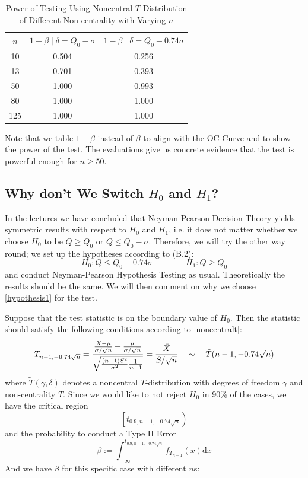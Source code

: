 \documentclass[12pt]{article}
\def\d{\mathrm{d}}
\begin{document}
\begin{table}[htbp]
    \centering
    \begin{tabular}{ccc}
        \toprule
        $n$ & $1-\beta\mid\delta = Q_0 - \sigma$ & $1-\beta\mid\delta = Q_0 - 0.74\sigma$ \\
        \midrule
        10 & 0.504 & 0.256 \\
        13 & 0.701 & 0.393 \\
        50 & 1.000 & 0.993 \\
        80 & 1.000 & 1.000 \\
        125 & 1.000 & 1.000 \\
        \bottomrule
    \end{tabular}
    \caption{Power of Testing Using Noncentral $T$-Distribution of Different Non-centrality with Varying $n$}
\end{table}

\noindent Note that we table $1-\beta$ instead of $\beta$ to align with the OC Curve and to show the power of the test. The evaluations give us concrete evidence that the test is powerful enough for $n\geq 50$.

\subsection{Why don't We Switch $H_0$ and $H_1$?}

In the lectures \cite{Ho2023} we have concluded that Neyman-Pearson Decision Theory yields symmetric results with respect to $H_0$ and $H_1$, i.e. it does not matter whether we choose $H_0$ to be $Q \geq Q_0$ or $Q \leq Q_0 - \sigma$. Therefore, we will try the other way round; we set up the hypotheses according to (B.2):
\begin{equation}\label{hypothesis2}
    H_0 : Q\leq Q_0 - 0.74\sigma \quad\quad\quad\quad H_1 : Q\geq Q_0
\end{equation}
and conduct Neyman-Pearson Hypothesis Testing as usual. Theoretically the results should be the same. We will then comment on why we choose \eqref{hypothesis1} for the test. 

Suppose that the test statistic is on the boundary value of $H_0$. Then the statistic should satisfy the following conditions according to \eqref{noncentralt}:
$$
T_{n-1,-0.74\sqrt{n}}=\frac{\frac{\Bar{X}-\mu}{\sigma/\sqrt{n}}+\frac{\mu}{\sigma/\sqrt{n}}}{\sqrt{\frac{(n-1)S^2}{\sigma^2}\frac{1}{n-1}}}=\frac{\Bar{X}}{S/\sqrt{n}}\quad\sim\quad \tilde{T}(n-1,-0.74\sqrt{n})
$$
where $\tilde{T}(\gamma, \delta)$ denotes a noncentral $T$-distribution with degrees of freedom $\gamma$ and non-centrality $T$. Since we would like to not reject $H_0$ in 90\% of the cases, we have the critical region
$$
\left[t_{0.9,n-1,-0.74\sqrt{n}}\right)
$$
and the probability to conduct a Type II Error
$$
\beta := \int_{-\infty}^{t_{0.9,n-1,-0.74\sqrt{n}}}f_{T_{n-1}}(x) \d x
$$ 
And we have $\beta$ for this specific case with different $n$s:
\end{document}
